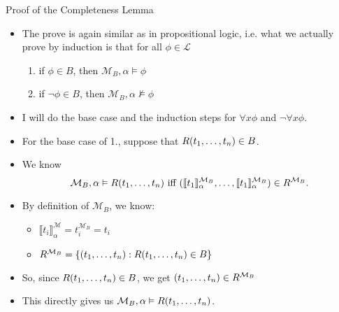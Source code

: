\begin{frame}{Proof of the Completeness Lemma}

  \begin{itemize}
  \item The prove is again similar as in propositional logic,
    i.e. what we actually prove by induction is that for all
    $\phi\in\mathcal{L}$
    \begin{enumerate}[1.]

                      \item if $\phi\in B$, then
                        $\mathcal{M}_B,\alpha\vDash\phi$

                        \item if $\neg\phi\in B$, then
                          $\mathcal{M}_B,\alpha\nvDash\phi$ 
                      
                        \end{enumerate}

             \item I will do the base case and the induction steps for
               $\forall x\phi$ and $\neg\forall x\phi$.

               \item For the base case of 1., suppose that
                 $R(t_1,\mathellipsis, t_n)\in B$.

                 \item We know \[\mathcal{M}_B,\alpha\vDash R(t_1,
                            \mathellipsis, t_n)\text{ iff }(\llbracket
                            t_1\rrbracket^{\mathcal{M}_B}_\alpha,
                            \mathellipsis, \llbracket
                            t_1\rrbracket^{\mathcal{M}_B}_\alpha)\in
                            R^{\mathcal{M}_B}.\]

                            \item By definition of $\mathcal{M}_B$, we
                              know:
                              \begin{itemize}
                              \item $\llbracket t_i\rrbracket^\mathcal{M}_\alpha=t_i^{\mathcal{M}_B}=t_i$
                                \item $R^{\mathcal{M}_B}=\{(t_1, \mathellipsis, t_n): R(t_1, \mathellipsis, t_n)\in B\}$
                                \end{itemize}

                                \item So, since $R(t_1,\mathellipsis,
                                  t_n)\in B$, we get $(t_1,
                                  \mathellipsis, t_n)\in
                                  R^{\mathcal{M}_{B}}$

                                  \item This directly gives us
                                    $\mathcal{M}_B,\alpha\vDash R(t_1,
                                    \mathellipsis, t_n)$.

  \end{itemize}

\end{frame}

